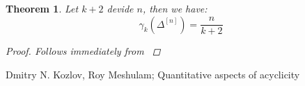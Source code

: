 \documentclass{article}
\newtheorem{thm}{Theorem}[section]
\begin{document}
\begin{thm}
Let $k+2$ devide $n$, then we have:
\[
\gamma_k(\Delta^{[n]})=\frac{n}{k+2}
\]
\begin{proof}
Follows immediately from \cite{1}
\end{proof}
\end{thm}



\begin{thebibliography}{9}

 Dmitry N. Kozlov, Roy Meshulam; Quantitative aspects of acyclicity

\end{thebibliography}
\end{document}

